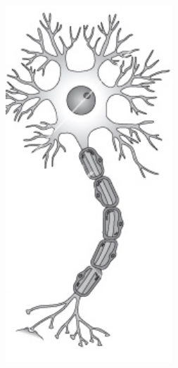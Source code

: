 \documentclass[aspectratio=169]{beamer}
\begin{document}
\begin{frame}
\begin{figure}[ht]
\begin{minipage}[b]{0.23\linewidth}
        \end{minipage}
        \begin{minipage}[b]{0.23\linewidth}
            \includegraphics[width=0.56\textwidth]{images/InactiveNeuron.jpg}
        \end{minipage}
        \begin{minipage}[b]{0.23\linewidth}

\end{minipage}
\end{figure}
\end{frame}
\end{document}
